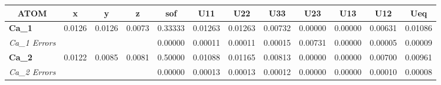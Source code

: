 \documentclass[]{scrartcl}
\begin{document}
	\begin{table}[]
	\centering
	
	\setlength\tabcolsep{2pt}
	\begin{tabular}{|l|l|l|l|l|l|l|l|l|l|l|l|}
		\hline
		\multicolumn{1}{|c|}{\textbf{ATOM} \cellcolor{LimeGreen}} & \multicolumn{1}{c|}{\cellcolor{LimeGreen} \textbf{x}} & \multicolumn{1}{c|}{\cellcolor{LimeGreen} \textbf{y}} & \multicolumn{1}{c|}{\cellcolor{LimeGreen} \textbf{z}} & \multicolumn{1}{c|}{\cellcolor{LimeGreen} \textbf{sof}} & \multicolumn{1}{c|}{\cellcolor{LimeGreen} \textbf{U11}} & \multicolumn{1}{c|}{\cellcolor{LimeGreen} \textbf{U22}} & \multicolumn{1}{c|}{\cellcolor{LimeGreen} \textbf{U33}} & \multicolumn{1}{c|}{\cellcolor{LimeGreen} \textbf{U23}} & \multicolumn{1}{c|}{\cellcolor{LimeGreen} \textbf{U13}} & \multicolumn{1}{c|}{\cellcolor{LimeGreen} \textbf{U12}} & \multicolumn{1}{c|}{\cellcolor{LimeGreen} \textbf{Ueq}} \\ \hline
		\textbf{Ca\_1}                        & 0.0126                          & 0.0126                          & 0.0073                          & 0.33333                           & 0.01263                           & 0.01263                           & 0.00732                           & 0.00000                           & 0.00000                           & 0.00631                           & 0.01086                           \\ \hline
		\textit{Ca\_1 Errors}                           &                                 &                                 &                                 & 0.00000                           & 0.00011                           & 0.00011                           & 0.00015                           & 0.00731                           & 0.00000                           & 0.00005                           & 0.00009                           \\ \hline
		\textbf{Ca\_2}                        & 0.0122                          & 0.0085                          & 0.0081                          & 0.50000                           & 0.01088                           & 0.01165                           & 0.00813                           & 0.00000                           & 0.00000                           & 0.00700                           & 0.00961                           \\ \hline
		\textit{Ca\_2 Errors}                           &                                 &                                 &                                 & 0.00000                           & 0.00013                           & 0.00013                           & 0.00012                           & 0.00000                           & 0.00000                           & 0.00010                           & 0.00008                           \\ \hline

\end{tabular}
\end{table}
\end{document}
